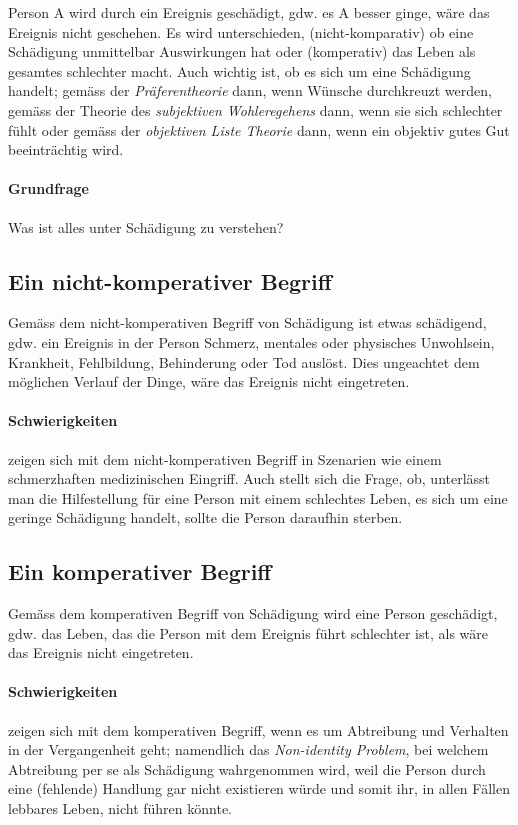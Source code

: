\documentclass[../main.tex]{subfiles}
\begin{document}
\begin{warningbox}
	Person A wird durch ein Ereignis geschädigt, gdw. es A besser ginge, wäre das Ereignis nicht geschehen. Es wird unterschieden, (nicht-komparativ) ob eine Schädigung unmittelbar Auswirkungen hat oder (komperativ) das Leben als gesamtes schlechter macht. Auch wichtig ist, ob es sich um eine Schädigung handelt; gemäss der \textit{Präferentheorie} dann, wenn Wünsche durchkreuzt werden, gemäss der Theorie des \textit{subjektiven Wohleregehens} dann, wenn sie sich schlechter fühlt oder gemäss der \textit{objektiven Liste Theorie} dann, wenn ein objektiv gutes Gut beeinträchtig wird. 
\end{warningbox}

\paragraph{Grundfrage} Was ist alles unter Schädigung zu verstehen?

\subsection{Ein nicht-komperativer Begriff}
Gemäss dem nicht-komperativen Begriff von Schädigung ist etwas schädigend, gdw. ein Ereignis in der Person Schmerz, mentales oder physisches Unwohlsein, Krankheit, Fehlbildung, Behinderung oder Tod auslöst. Dies ungeachtet dem möglichen Verlauf der Dinge, wäre das Ereignis nicht eingetreten. 

\paragraph{Schwierigkeiten} zeigen sich mit dem nicht-komperativen Begriff in Szenarien wie einem schmerzhaften medizinischen Eingriff. Auch stellt sich die Frage, ob, unterlässt man die Hilfestellung für eine Person mit einem schlechtes Leben, es sich um eine geringe Schädigung handelt, sollte die Person daraufhin sterben. 

\subsection{Ein komperativer Begriff}
Gemäss dem komperativen Begriff von Schädigung wird eine Person geschädigt, gdw. das Leben, das die Person mit dem Ereignis führt schlechter ist, als wäre das Ereignis nicht eingetreten. 

\paragraph{Schwierigkeiten} zeigen sich mit dem komperativen Begriff, wenn es um Abtreibung und Verhalten in der Vergangenheit geht; namendlich das \textit{Non-identity Problem}, bei welchem Abtreibung per se als Schädigung wahrgenommen wird, weil die Person durch eine (fehlende) Handlung gar nicht existieren würde und somit ihr, in allen Fällen lebbares Leben, nicht führen könnte. 
\end{document}
